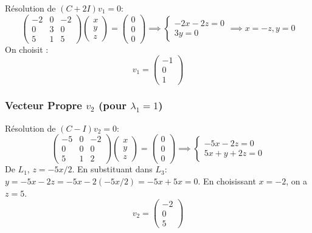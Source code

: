 \documentclass[french]{yLectureNote}
\begin{document}
Résolution de $(C + 2I)v_1 = 0$:
$$\begin{pmatrix} -2 & 0 & -2 \\ 0 & 3 & 0 \\ 5 & 1 & 5 \end{pmatrix} \begin{pmatrix} x \\ y \\ z \end{pmatrix} = \begin{pmatrix} 0 \\ 0 \\ 0 \end{pmatrix} \implies \begin{cases} -2x - 2z = 0 \\ 3y = 0 \end{cases} \implies x = -z, y = 0$$
On choisit :
$$v_1 = \begin{pmatrix} -1 \\ 0 \\ 1 \end{pmatrix}$$

\subsubsection{Vecteur Propre $v_2$ (pour $\lambda_1 = 1$)}

Résolution de $(C - I)v_2 = 0$:
$$\begin{pmatrix} -5 & 0 & -2 \\ 0 & 0 & 0 \\ 5 & 1 & 2 \end{pmatrix} \begin{pmatrix} x \\ y \\ z \end{pmatrix} = \begin{pmatrix} 0 \\ 0 \\ 0 \end{pmatrix} \implies \begin{cases} -5x - 2z = 0 \\ 5x + y + 2z = 0 \end{cases}$$
De $L_1$, $z = -5x/2$. En substituant dans $L_3$: $y = -5x - 2z = -5x - 2(-5x/2) = -5x + 5x = 0$.
En choisissant $x=-2$, on a $z=5$.
$$v_2 = \begin{pmatrix} -2 \\ 0 \\ 5 \end{pmatrix}$$
\end{document}

